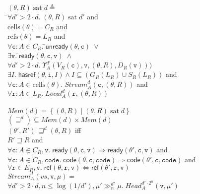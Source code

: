 \documentclass[preprint]{sigplanconf}
\newcommand{\setof}[1]{\left\{{#1}\right\}}
\newcommand{\comprehend}[2]{\setof{{#1}\;|\;{#2}}}
\newcommand{\betterstate}[3]{{#2}\, {\sqsupseteq}^{#1} {#3}}
\newcommand{\futurestate}[4]{{#3} \gg^{#1}_{#2} {#4}}
\newcommand{\ready}[3]{\mathsf{ready}({#1}, {#2}, {#3})}
\newcommand{\unready}[2]{\mathsf{unready}({#1}, {#2})}
\newcommand{\cells}[1]{\mathrm{cells}({#1})}
\newcommand{\refs}[1]{\mathrm{refs}({#1})}
\newcommand{\hasref}[3]{\mathsf{hasref}({#1}, {#2}, {#3})}
\renewcommand{\implies}{\Rightarrow}
\newcommand{\term}[1]{\ensuremath{\mathtt{{#1}}}}
\newcommand{\Head}{\mathit{Head}}
\newcommand{\Local}{\mathit{Local}}
\newcommand{\Stream}{\mathit{Stream}}
\newcommand{\Mem}[1]{\mathit{Mem}(#1)}
\newcommand{\satisfy}[2]{{#1}\;\mathrm{sat}\;{#2}}
\begin{document}
\begin{figure}
\begin{tabbing}
$\satisfy{(\theta,R)}{d} \triangleq$ \\
\;\;\=$\forall d' > 2 \cdot d.\; \satisfy{(\theta,R)}{d'}$ and \\
    \>$\cells{\theta} = C_R$ and \\
    \>$\refs{\theta} = L_R$ and \\
    \>$\forall \term{c}:A \in C_R.\;$\=$\unready{\theta}{\term{c}} \;\vee$ \\
    \>                               \>$\exists \term{v}.\; $\=$\ready{\theta}{\term{c}}{\term{v}} \;\land$ \\
    \>                               \>                     \>$\forall d' > 2\cdot d.\;\Upsilon^{d'}_A(V_R(\term{c}),\term{v}, (\theta,R), D_R(\term{v})))$\\
    \>$\exists I.\;\hasref{\theta}{\term{i}}{I} \land I \subseteq (G_R(L_R) \cup S_R(L_R))$ and \\
    \>$\forall \term{c}:A \in \cells{\theta}.\;\Stream^d_A(\term{c}, (\theta, R))$ and \\
    \>$\forall \term{r}:A \in L_R.\; \Local^d_A(\term{r}, (\theta, R))$ \\
\\[1em]

$\Mem{d} = \comprehend{(\theta,R)}{\satisfy{(\theta,R)}{d}}$ 
\\[1em]

$(\sqsupseteq^d) \subseteq \Mem{d} \times \Mem{d}$ \\[0.2em]

$\betterstate{d}{(\theta',R')}{(\theta,R)}$ iff \\
\> $R' \sqsupseteq R$ and \\
\> $\forall \term{c}:A \in C_R, \term{v}.\; \ready{\theta}{\term{c}}{\term{v}} \implies \ready{\theta'}{\term{c}}{\term{v}}$ and \\
\> $\forall \term{c}:A \in C_R, \term{code}.\; \mathsf{code}(\theta, \term{c}, \term{code}) \implies \mathsf{code}(\theta', \term{c}, \term{code})$ and \\
\> $\forall \term{r}\in E_R, \term{v}.\; \mathsf{ref}(\theta, \term{r}, \term{v}) \iff 
                                         \mathsf{ref}(\theta', \term{r}, \term{v}) $
\\[1em]

$\Stream^d_A(vs, \term{v}, \mu) = $ \\
\> $\forall d' > 2\cdot d, n \leq \log(1/d'), \futurestate{d'}{n}{\mu'}{\mu}.\; \Head^{d'\cdot 2^n}_A(\term{v}, \mu')$ 
\\[1em]


\end{tabbing}
\end{figure}
\end{document}
